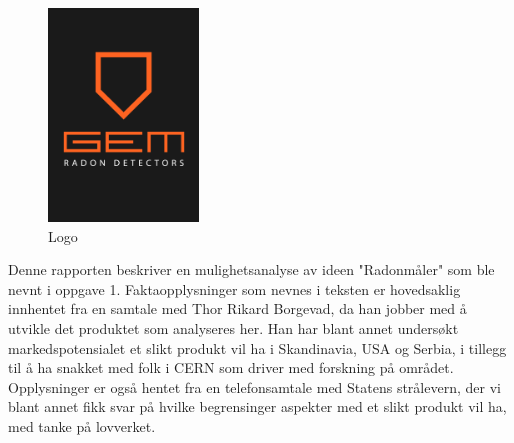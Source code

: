 \begin{figure}[ht!]
    \centering
    \includegraphics[width=40mm]{gem-radon-detectors.jpg}
    \caption{Logo}
    \label{fig:logo}
\end{figure}

Denne rapporten beskriver en mulighetsanalyse av ideen "Radonmåler" som ble nevnt i oppgave 1.
Faktaopplysninger som nevnes i teksten er hovedsaklig innhentet fra en samtale med Thor Rikard Borgevad, da han jobber med å utvikle det produktet som analyseres her. Han har blant annet undersøkt markedspotensialet et slikt produkt vil ha i Skandinavia, USA og Serbia, i tillegg til å ha snakket med folk i CERN som driver med forskning på området.
Opplysninger er også hentet fra en telefonsamtale med Statens strålevern, der vi blant annet fikk svar på hvilke begrensinger aspekter med et slikt produkt vil ha, med tanke på lovverket.  
